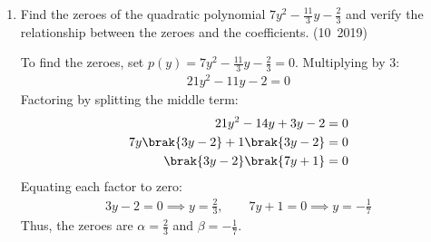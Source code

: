 \begin{enumerate}[label=\thesubsection.\arabic*, ref=\thesubsection.\theenumi]
	\solution
	From \eqref{eq:CBSE10-2019-poly_mod}, work in the quotient ring $\mathbb{R}[x] / \langle 3x^2 - 5 \rangle$, where the divisor induces the reduction relation:
	\begin{align}
		3x^2 - 5 \equiv 0 \implies x^2 \equiv \frac{5}{3}
	\end{align}
	Higher powers of the state variable $x$ reduce algebraically:
	\begin{align}
		x^3 &= x \cdot x^2 \equiv \frac{5}{3}x \\
		x^4 &= \brak{x^2}^2 \equiv \brak{\frac{5}{3}}^2 = \frac{25}{9}
	\end{align}
	Projecting $f(x)$ modulo $3x^2 - 5$:
	\begin{align}
		f(x) &\equiv 3\brak{\frac{25}{9}} - 9\brak{\frac{5}{3}x} + \brak{\frac{5}{3}} + 15x + k \\
		&\equiv \frac{25}{3} - 15x + \frac{5}{3} + 15x + k \\
		&\equiv \frac{30}{3} + k \equiv 10 + k \pmod{3x^2 - 5}
	\end{align}
	For $f(x)$ to be completely divisible, the remainder residue must be zero:
	\begin{align}
		10 + k = 0 \implies k = -10
	\end{align}
	The following code verifies the polynomial division:
	\begin{lstlisting}[frame=single, basicstyle=\ttfamily\small]
		codes/10/q29.py
	\end{lstlisting}
	
	\item Find the zeroes of the quadratic polynomial $7y^2-\frac{11}{3}y-\frac{2}{3}$ and verify the relationship between the zeroes and the coefficients.
	\hfill (10~2019)
	
	\solution
	To find the zeroes, set $p(y) = 7y^2 - \frac{11}{3}y - \frac{2}{3} = 0$.
	Multiplying by $3$:
	\begin{align}
		21y^2 - 11y - 2 = 0
	\end{align}
	Factoring by splitting the middle term:
	\begin{align}
		21y^2 - 14y + 3y - 2 &= 0 \\
		7y\brak{3y - 2} + 1\brak{3y - 2} &= 0 \\
		\brak{3y - 2}\brak{7y + 1} &= 0
	\end{align}
	Equating each factor to zero:
	\begin{align}
		3y - 2 = 0 \implies y = \frac{2}{3}, \qquad 7y + 1 = 0 \implies y = -\frac{1}{7}
	\end{align}
	Thus, the zeroes are $\alpha = \frac{2}{3}$ and $\beta = -\frac{1}{7}$.
	

\end{enumerate}

